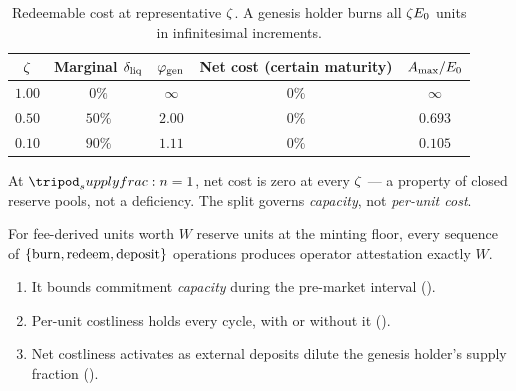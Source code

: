 \documentclass[../main.tex]{subfiles}
\begin{document}
\begin{table}[h!]
    \centering
    \caption{Redeemable cost at representative $\zeta$. A genesis holder burns all
    $\zeta E\sb{0}$ \liveclass{} units in infinitesimal increments.}
    \label{tab:costliness:redeemable-cost}
    \begin{tabular}{@{}c c c c c@{}}
        \toprule
        $\zeta$ & Marginal $\delta\sb{\mathrm{liq}}$ & $\varphi\sb{\mathrm{gen}}$
            & Net cost (certain maturity) & $A\sb{\max}/E\sb{0}$ \\
        \midrule
        $1.00$ & $0\%$  & $\infty$ & $0\%$ & $\infty$ \\
        $0.50$ & $50\%$ & $2.00$   & $0\%$ & $0.693$ \\
        $0.10$ & $90\%$ & $1.11$   & $0\%$ & $0.105$ \\
        \bottomrule
    \end{tabular}
\end{table}

\begin{remark}
    \label{rem:costliness:dominant-holder-cost}
    At $\supplyfrac{} = 1$, net cost is zero at every $\zeta$ --- a property of closed
    reserve pools, not a deficiency. The split governs \emph{capacity}, not \emph{per-unit
    cost}.
\end{remark}

\begin{proposition}
    \label{prop:costliness:no-recycling-advantage}
    For fee-derived \liveclass{} units worth $W$ reserve units at the minting floor, every
    sequence of $\lbrace\text{burn}, \text{redeem}, \text{deposit}\rbrace$ operations produces
    operator attestation exactly $W$.
\end{proposition}

\begin{remark}
    \label{rem:costliness:tlock-class-summary}
    \begin{enumerate}[nosep]
        \item It bounds commitment \emph{capacity} during the pre-market interval
            ().
        \item Per-unit costliness holds every cycle, with or without it
            ().
        \item Net costliness activates as external deposits dilute the genesis holder's
            supply fraction ().
    \end{enumerate}
\end{remark}
\end{document}
